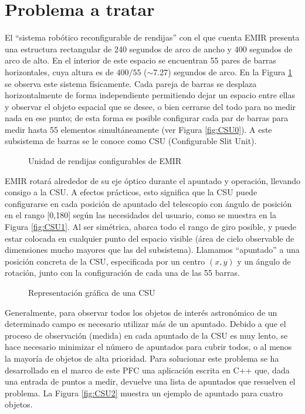 \section{Problema a tratar}

El ``sistema robótico reconfigurable de rendijas'' con el que cuenta EMIR
presenta una estructura rectangular de 240 segundos de arco de ancho y 400
segundos de arco de alto. En el interior de este espacio se encuentran 55 pares
de barras horizontales, cuya altura es de $400/55$ ($\sim$7.27) segundos de arco.
En la Figura \ref{fig:CSUreal} se observa este sistema físicamente.
Cada pareja de barras se desplaza horizontalmente de forma independiente permitiendo
dejar un espacio entre ellas y observar el objeto espacial que se desee, o
bien cerrarse del todo para no medir nada en ese punto; de esta forma es posible
configurar cada par de barras para medir hasta 55 elementos simultáneamente (ver
Figura \ref{fig:CSU0}). 
A este subsistema de barras se le conoce como CSU (Configurable Slit Unit).

\begin{figure}[!htb]
\centering
{}
\caption{Unidad de rendijas configurables de EMIR}
\label{fig:CSUreal}
\end{figure}

EMIR rotará alrededor de su eje óptico durante el apuntado y operación, llevando
consigo a la CSU.  A efectos prácticos, esto significa que la CSU puede
configurarse en cada posición de apuntado del telescopio con ángulo de posición
en el rango [0,180] según las necesidades del usuario, como se muestra en la Figura
\ref{fig:CSU1}. Al ser simétrica, abarca todo el rango de giro posible, y puede 
estar colocada en cualquier punto del espacio visible (área de cielo observable
de dimensiones mucho mayores que las del subsistema). Llamamos ``apuntado'' a
una posición concreta de la CSU, especificada por un centro $(x,y)$ y un ángulo
de rotación, junto con la configuración de cada una de las 55 barras.

\begin{figure}[!htb]
\centering
{}
\caption{Representación gráfica de una CSU}
\end{figure}

Generalmente, para observar todos los objetos de interés astronómico de un
determinado campo es necesario utilizar más de un apuntado. Debido a que el
proceso de observación (medida) en cada apuntado de la CSU es muy lento, se hace
necesario minimizar el número de apuntados para cubrir todos, o al menos la
mayoría de  objetos de alta prioridad.  Para solucionar este problema se ha
desarrollado en el marco de este PFC una aplicación escrita en C++ que, dada una
entrada de puntos a medir, devuelve una lista de apuntados que resuelven el
problema. La Figura \ref{fig:CSU2} muestra un ejemplo de apuntado para cuatro
objetos.

